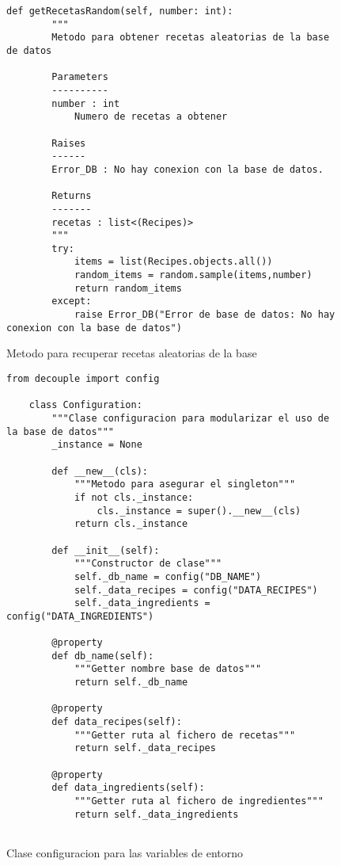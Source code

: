 \begin{figure}[H]
    \begin{lstlisting}[style=python]
        def getRecetasRandom(self, number: int):
        """
        Metodo para obtener recetas aleatorias de la base de datos

        Parameters
        ----------
        number : int
            Numero de recetas a obtener

        Raises
        ------
        Error_DB : No hay conexion con la base de datos.

        Returns
        -------
        recetas : list<(Recipes)>
        """
        try:
            items = list(Recipes.objects.all())
            random_items = random.sample(items,number)
            return random_items
        except:
            raise Error_DB("Error de base de datos: No hay conexion con la base de datos")
    \end{lstlisting}
    \caption{Metodo para recuperar recetas aleatorias de la \gls{base}}
    \label{sni:buscarRecetaAleatorias}
\end{figure}

\newpage
\begin{figure}[H]
\begin{lstlisting}[style=python]
    from decouple import config

    class Configuration:
        """Clase configuracion para modularizar el uso de la base de datos"""
        _instance = None
    
        def __new__(cls):
            """Metodo para asegurar el singleton"""
            if not cls._instance:
                cls._instance = super().__new__(cls)
            return cls._instance
        
        def __init__(self):
            """Constructor de clase"""
            self._db_name = config("DB_NAME")
            self._data_recipes = config("DATA_RECIPES")
            self._data_ingredients = config("DATA_INGREDIENTS")
        
        @property
        def db_name(self):
            """Getter nombre base de datos"""
            return self._db_name
    
        @property
        def data_recipes(self):
            """Getter ruta al fichero de recetas"""
            return self._data_recipes
        
        @property
        def data_ingredients(self):
            """Getter ruta al fichero de ingredientes"""
            return self._data_ingredients
    
\end{lstlisting}
\caption{Clase configuracion para las variables de entorno}
\label{sni:entorno}
\end{figure}